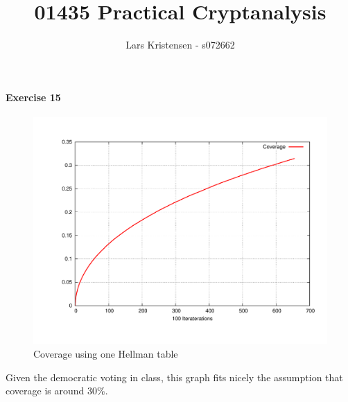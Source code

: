 \documentclass[10pt,a4paper]{article}
\title{01435 Practical Cryptanalysis}
\author{Lars Kristensen - s072662}
\begin{document}
\maketitle

\paragraph*{Exercise 15}
\begin{figure}[h]
\centering
\includegraphics[scale=0.4]{../output/ex15.pdf}
 \caption{Coverage using one Hellman table}
 \label{fig:ex15}
\end{figure}
Given the democratic voting in class, this graph fits nicely the assumption that coverage is around 30\%.

\end{document}
